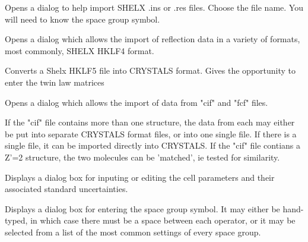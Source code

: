 \documentclass[10pt,a4paper]{report}
\begin{document}
\bigskip{}




Opens a dialog to help import SHELX .ins or .res files. Choose the
file name. You will need to know the space group symbol.


\bigskip{}




Opens a dialog which allows the import of reflection data in a variety
of formats, most commonly, SHELX HKLF4 format.





\bigskip{}




Converts a Shelx HKLF5 file into CRYSTALS format. Gives the 
opportunity to enter the twin law matrices







\bigskip{}




Opens a dialog which allows the import of data from "cif"  and "fcf" 
files.


If the "cif" file contains more than one structure, the data from 
each may either be put into separate CRYSTALS format files, or into one
single file. If there is a single file, it can be imported directly into
CRYSTALS.  If the "cif" file contians a Z'=2 structure, the two 
molecules can be 'matched', ie tested for similarity.



\bigskip{}




Displays a dialog box for inputing or editing the cell parameters and
their associated standard uncertainties.


\bigskip{}




Displays a dialog box for entering the space group symbol. It may
either be hand-typed, in which case there must be a space between each
operator, or it may be selected from a list of the most common settings
of every space group.





\bigskip{}
\end{document}
